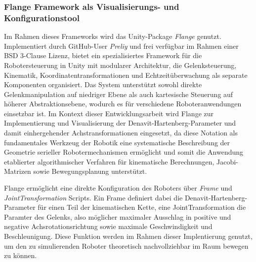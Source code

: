 \subsubsection{Flange Framework als Visualisierungs- und Konfigurationstool}
Im Rahmen dieses Frameworks wird das Unity-Package
\textit{Flange} genutzt. Implementiert durch GitHub-User \textit{Preliy} und frei
verfügbar im Rahmen einer BSD 3-Clause Lizenz, bietet ein spezialisiertes
Framework für die Robotersteuerung in Unity mit modularer Architektur, die
Gelenksteuerung, Kinematik, Koordinatentransformationen und Echtzeitüberwachung
als separate Komponenten organisiert. Das System unterstützt sowohl direkte
Gelenkmanipulation auf niedriger Ebene als auch kartesische Steuerung auf
höherer Abstraktionsebene, wodurch es für verschiedene Roboteranwendungen
einsetzbar ist. Im Kontext dieser Entwicklungsarbeit wird Flange zur
Implementierung und Visualisierung der Denavit-Hartenberg-Parameter und damit
einhergehender Achstransformationen eingesetzt,
da diese Notation als fundamentales Werkzeug der Robotik eine systematische
Beschreibung der Geometrie serieller Robotermechanismen ermöglicht und somit die
Anwendung etablierter algorithmischer Verfahren für kinematische Berechnungen,
Jacobi-Matrizen sowie Bewegungsplanung unterstützt.

Flange ermöglicht eine direkte Konfiguration des Roboters über \textit{Frame}
und \textit{JointTransformation} Scripts. Ein Frame definiert dabei die
Denavit-Hartenberg-Parameter für einen Teil der kinematischen Kette, eine
JointTransformation die Paramter des Gelenks, also möglicher maximaler Ausschlag
in positive und negative Achsrotationsrichtung sowie maximale Geschwindigkeit
und Beschleunigung. Diese Funktion werden im Rahmen dieser Implentierung
genutzt, um den zu simulierenden Roboter theoretisch nachvollziehbar im Raum
bewegen zu können.

